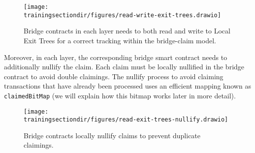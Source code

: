 \begin{figure}[H]
\centering
\texttt{[image: \\trainingsectiondir/figures/read-write-exit-trees.drawio]}
\caption{Bridge contracts in each layer needs to both read and write to Local Exit Trees for a correct tracking within the bridge-claim model.}
\label{fig:rw-local-exit-tree}
\end{figure}

Moreover, in each layer, the corresponding bridge smart contract needs to additionally nullify the claim. Each claim must be locally nullified in
the bridge contract to avoid double claimings. The nullify process to avoid claiming transactions that have already been processed uses an efficient mapping
known as \texttt{claimedBitMap} (we will explain how this bitmap works later in more detail).

\begin{figure}[H]
\centering
\texttt{[image: \\trainingsectiondir/figures/read-exit-trees-nullify.drawio]}
\caption{Bridge contracts locally nullify claims to prevent duplicate claimings.}
\label{fig:nullify-claims}
\end{figure}





